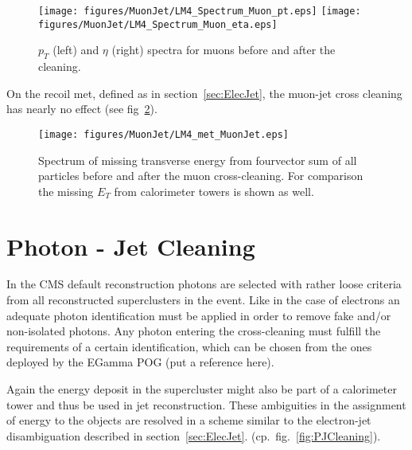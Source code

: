 \documentclass{cmspaper}
\begin{document}
\begin{figure}[hb]
\begin{center}
    \texttt{[image: figures/MuonJet/LM4\_Spectrum\_Muon\_pt.eps]}
    \texttt{[image: figures/MuonJet/LM4\_Spectrum\_Muon\_eta.eps]}
    \caption{\(p_T\) (left) and \(\eta\) (right) spectra for muons before and after the cleaning.}
\label{fig:ObjSpectra_MuonJet}
\end{center}
\end{figure} 

On the recoil met, defined as in section~\ref{sec:ElecJet}, the muon-jet cross cleaning has nearly no effect (see fig~\ref{fig:met_MuonJet}).

\begin{figure}[hb]
\begin{center}
    \texttt{[image: figures/MuonJet/LM4\_met\_MuonJet.eps]}
    \caption{Spectrum of missing transverse energy from fourvector sum of all
    particles before and after the muon cross-cleaning. For comparison the missing
    $E_T$ from calorimeter towers is shown as well.}
\label{fig:met_MuonJet}
\end{center}
\end{figure}

\newpage


\section{Photon - Jet Cleaning}
In the CMS default reconstruction photons are selected with rather loose criteria
from all reconstructed superclusters in the event. Like in the case of electrons
an adequate photon identification must be applied in order to remove fake and/or
non-isolated photons. Any photon entering the cross-cleaning must fulfill the
requirements of a certain identification, which can be chosen from the ones
deployed by the EGamma POG (put a reference here). 

Again the energy deposit in the supercluster might also be part of a
calorimeter tower and thus be used in jet reconstruction. These ambiguities in
the assignment of energy to the objects are resolved in a scheme similar to the
electron-jet disambiguation described in section~\ref{sec:ElecJet}. 
(cp.~fig.~\ref{fig:PJCleaning}).
\end{document}

